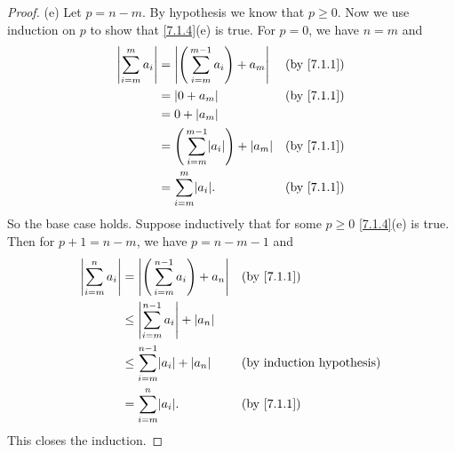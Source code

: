 \begin{proof}{(e)}
  Let \(p = n - m\).
  By hypothesis we know that \(p \geq 0\).
  Now we use induction on \(p\) to show that \cref{7.1.4}(e) is true.
  For \(p = 0\), we have \(n = m\) and
  \begin{align*}
    \abs{\sum_{i = m}^m a_i} & = \abs{\Bigg(\sum_{i = m}^{m - 1} a_i\Bigg) + a_m}       &  & \by{7.1.1} \\
                             & = \abs{0 + a_m}                                          &  & \by{7.1.1} \\
                             & = 0 + \abs{a_m}                                                          \\
                             & = \Bigg(\sum_{i = m}^{m - 1} \abs{a_i}\Bigg) + \abs{a_m} &  & \by{7.1.1} \\
                             & = \sum_{i = m}^m \abs{a_i}.                              &  & \by{7.1.1}
  \end{align*}
  So the base case holds.
  Suppose inductively that for some \(p \geq 0\) \cref{7.1.4}(e) is true.
  Then for \(p + 1 = n - m\), we have \(p = n - m - 1\) and
  \begin{align*}
    \abs{\sum_{i = m}^n a_i} & = \abs{\Bigg(\sum_{i = m}^{n - 1} a_i\Bigg) + a_n} &  & \by{7.1.1} \\
                             & \leq \abs{\sum_{i = m}^{n - 1} a_i} + \abs{a_n}                    \\
                             & \leq \sum_{i = m}^{n - 1} \abs{a_i} + \abs{a_n}    &  & \byIH      \\
                             & = \sum_{i = m}^n \abs{a_i}.                        &  & \by{7.1.1}
  \end{align*}
  This closes the induction.
\end{proof}

